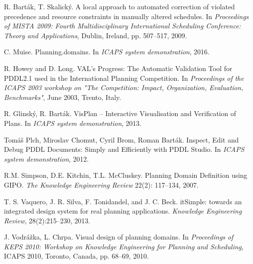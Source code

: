 \documentclass[letterpaper]{article}
\begin{document}
\begin{thebibliography}{}

R. Bart\'{a}k, T. Skalick\'{y}. A local approach to automated correction of violated precedence and resource constraints in manually altered schedules. In \emph{Proceedings of MISTA 2009: Fourth Multidisciplinary International Scheduling Conference: Theory and Applications}, Dublin, Ireland, pp. 507--517, 2009.

C. Muise. Planning.domains. In \emph{ICAPS system demonstration}, 2016.

R. Howey and D. Long. VAL's Progress: The Automatic Validation Tool for PDDL2.1 used in the International Planning Competition. In \emph{Proceedings of the ICAPS 2003 workshop on "The Competition: Impact, Organization, Evaluation, Benchmarks"}, June 2003, Trento, Italy.

R. Glinsk\'{y}, R. Bart\'{a}k. VisPlan -- Interactive Visualisation and Verification of Plans. In \emph{ICAPS system demonstration}, 2013.

Tom\'{a}\v{s} Plch, Miroslav Chomut, Cyril Brom, Roman Bart\'{a}k. Inspect, Edit and Debug PDDL Documents: Simply and Efficiently with PDDL Studio. In \emph{ICAPS system demonstration}, 2012.

R.M. Simpson, D.E. Kitchin, T.L. McCluskey. Planning Domain Definition using GIPO. \emph{The Knowledge Engineering Review} 22(2): 117--134, 2007.

T. S. Vaquero, J. R. Silva, F. Tonidandel, and J. C. Beck. itSimple: towards an integrated design system for real planning applications. \emph{Knowledge Engineering Review}, 28(2):215--230, 2013.

J. Vodr\'{a}\v{z}ka, L. Chrpa. Visual design of planning domains. In \emph{Proceedings of KEPS 2010: Workshop on Knowledge Engineering for Planning and Scheduling}, ICAPS 2010, Toronto, Canada, pp. 68--69, 2010.

\end{thebibliography}


\end{document}
